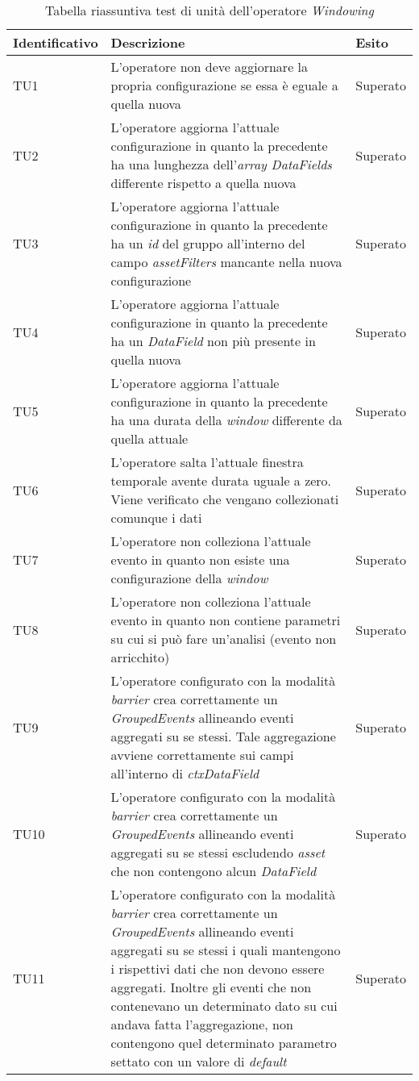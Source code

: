 {
\centering
\begin{longtable}{L{3cm} L{8.5cm} L{2cm}}
\caption{Tabella riassuntiva test di unità dell'operatore \textit{Windowing}}\\
\textbf{Identificativo} &
\textbf{Descrizione}&
\textbf{Esito}\\
\endhead
\hline

TU1 & L'operatore non deve aggiornare la propria configurazione se essa è eguale a quella nuova & Superato \\
\hline
TU2 & L'operatore aggiorna l'attuale configurazione in quanto la precedente ha una lunghezza dell'\textit{array DataFields} differente rispetto a quella nuova & Superato \\
\hline
TU3 & L'operatore aggiorna l'attuale configurazione in quanto la precedente ha un \textit{id} del gruppo all'interno del campo \textit{assetFilters} mancante nella nuova configurazione & Superato\\
\hline
TU4 & L'operatore aggiorna l'attuale configurazione in quanto la precedente ha un \textit{DataField} non più presente in quella nuova & Superato \\
\hline
TU5 & L'operatore aggiorna l'attuale configurazione in quanto la precedente ha una durata della \textit{window} differente da quella attuale & Superato\\
\hline
TU6 & L'operatore salta l'attuale finestra temporale avente durata uguale a zero. Viene verificato che vengano collezionati comunque i dati & Superato \\
\hline
TU7 & L'operatore non colleziona l'attuale evento in quanto non esiste una configurazione della \textit{window} & Superato \\
\hline
TU8 & L'operatore non colleziona l'attuale evento in quanto non contiene parametri su cui si può fare un'analisi (evento non arricchito) & Superato \\
\hline
TU9 & L'operatore configurato con la modalità \textit{barrier} crea correttamente un \textit{GroupedEvents} allineando eventi aggregati su se stessi. Tale aggregazione avviene correttamente sui campi all'interno di \textit{ctxDataField} & Superato \\
\hline
TU10 & L'operatore configurato con la modalità \textit{barrier} crea correttamente un \textit{GroupedEvents} allineando eventi aggregati su se stessi escludendo \textit{asset} che non contengono alcun \textit{DataField} & Superato \\
\hline
TU11 & L'operatore configurato con la modalità \textit{barrier} crea correttamente un \textit{GroupedEvents} allineando eventi aggregati su se stessi i quali mantengono i rispettivi dati che non devono essere aggregati. Inoltre gli eventi che non contenevano un determinato dato su cui andava fatta l'aggregazione, non contengono quel determinato parametro settato con un valore di \textit{default} & Superato \\

\end{longtable}}
